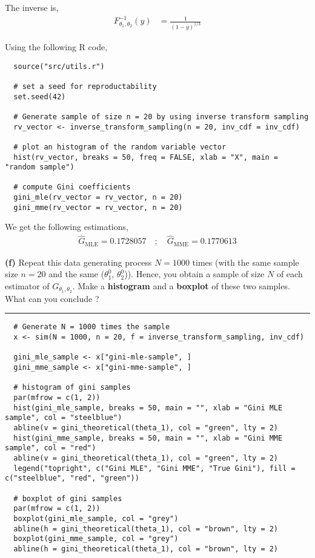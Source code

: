 \documentclass[10pt, a4paper, nofootinbib]{scrartcl}
\begin{document}
The inverse is, 
\begin{align*}
  F^{-1}_{\theta_1, \theta_2}(y) 
    &= \frac{1}{(1-y)^{1/3}}
\end{align*}

Using the following R code,
\begin{verbatim}
  source("src/utils.r")

  # set a seed for reproductability
  set.seed(42)

  # Generate sample of size n = 20 by using inverse transform sampling
  rv_vector <- inverse_transform_sampling(n = 20, inv_cdf = inv_cdf)

  # plot an histogram of the random variable vector
  hist(rv_vector, breaks = 50, freq = FALSE, xlab = "X", main = "random sample")

  # compute Gini coefficients
  gini_mle(rv_vector = rv_vector, n = 20)
  gini_mme(rv_vector = rv_vector, n = 20)
\end{verbatim}

We get the following estimations,
\begin{equation}
  \begin{array}{rl}
    \hat{G}_{\text{MLE}} = 0.1728057 \quad ; \quad \hat{G}_{\text{MME}} = 0.1770613
  \end{array}
\end{equation}

\textbf{(f)} Repeat this data generating process $N = 1000$ times (with the same sample size $n = 20$ and the same ($\theta_1^0$, $\theta_2^0$)). Hence, you obtain a sample of size $N$ of each estimator of $G_{\theta_1, \theta_2}$. Make a \textbf{histogram} and a \textbf{boxplot} of these two samples. What can you conclude ?

\begin{center}\rule{6cm}{0.4pt}\end{center}

\begin{verbatim}
  # Generate N = 1000 times the sample
  x <- sim(N = 1000, n = 20, f = inverse_transform_sampling, inv_cdf)

  gini_mle_sample <- x["gini-mle-sample", ]
  gini_mme_sample <- x["gini-mme-sample", ]

  # histogram of gini samples
  par(mfrow = c(1, 2))
  hist(gini_mle_sample, breaks = 50, main = "", xlab = "Gini MLE sample", col = "steelblue")
  abline(v = gini_theoretical(theta_1), col = "green", lty = 2)
  hist(gini_mme_sample, breaks = 50, main = "", xlab = "Gini MME sample", col = "red")
  abline(v = gini_theoretical(theta_1), col = "green", lty = 2)
  legend("topright", c("Gini MLE", "Gini MME", "True Gini"), fill = c("steelblue", "red", "green"))

  # boxplot of gini samples
  par(mfrow = c(1, 2))
  boxplot(gini_mle_sample, col = "grey")
  abline(h = gini_theoretical(theta_1), col = "brown", lty = 2)
  boxplot(gini_mme_sample, col = "grey")
  abline(h = gini_theoretical(theta_1), col = "brown", lty = 2)
\end{verbatim}
\end{document}
